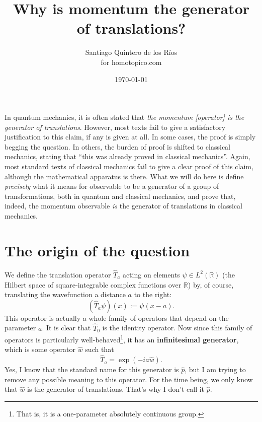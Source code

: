 \documentclass[11pt,a4]{article}
\title{Why is momentum the generator of translations?}
\author{Santiago Quintero de los Ríos\\{\small for homotopico.com}} \date{\today}
\begin{document}
\maketitle

In quantum mechanics, it is often stated that \emph{the momentum [operator] is the generator of translations}. However, most texts fail to give a satisfactory justification to this claim, if any is given at all. In some cases, the proof is simply begging the question. In others, the burden of proof is shifted to classical mechanics, stating that ``this was already proved in classical mechanics''. Again, most standard texts of classical mechanics fail to give a clear proof of this claim, although the mathematical apparatus is there. What we will do here is define \emph{precisely} what it means for observable to be a generator of a group of transformations, both in quantum and classical mechanics, and prove that, indeed, the momentum observable \emph{is} the generator of translations in classical mechanics.


\section*{The origin of the question}
\label{sec:origin-question}

We define the translation operator $\hat{T}_a$ acting on elements $\psi\in L^2(\mathbb{R})$ (the Hilbert space of square-integrable complex functions
over $\mathbb{R}$) by,
of course, translating the wavefunction a distance $a$ to the right:
\begin{equation}
  (\hat{T}_a\psi)(x) := \psi(x-a).
\end{equation}
This operator is actually a whole family of operators that depend on the parameter $a$.
It is clear that $\hat{T}_0$ is the identity operator. Now since this family of operators
is particularly well-behaved\footnote{That is, it is a one-parameter absolutely continuous group.}, it has an
\textbf{infinitesimal generator}, which is some operator $\hat{w}$ such that
\begin{equation}
  \label{eq:1}
  \hat{T}_a = \exp\left(-ia\hat{w}\right).
\end{equation}
Yes, I know that the standard name for this generator is $\hat{p}$, but
I am trying to remove any possible meaning to this operator. For the time being, we only
know that $\hat{w}$ is the generator of translations. That's why I don't call it $\hat{p}$.
\end{document}
